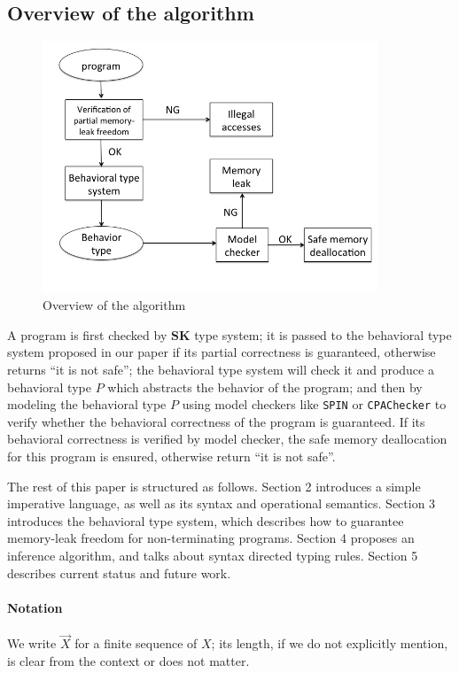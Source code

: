 \documentclass[english]{jssst_ppl} %
\theoremstyle{definition}
\begin{document}
\subsection{Overview of the algorithm}

\begin{figure}
 \centering
\includegraphics[width=10cm]{overview.jpg}
\caption{Overview of the algorithm}
\label{fig:ov}
\end{figure}

A program is first checked by $\mathbf{SK}$ type system; it is passed
to the behavioral type system proposed in our paper if its partial
correctness is guaranteed, otherwise returns ``it is not safe''; the
behavioral type system will check it and produce a behavioral type $P$
which abstracts the behavior of the program; and then by modeling the
behavioral type $P$ using model checkers like \texttt{SPIN} or
\texttt{CPAChecker} to verify whether the behavioral correctness of
the program is guaranteed. If its behavioral correctness is verified
by model checker, the safe memory deallocation for this program is
ensured, otherwise return ``it is not safe''.

The rest of this paper is structured as follows. Section 2 introduces
a simple imperative language, as well as its syntax and operational
semantics. Section 3 introduces the behavioral type system, which
describes how to guarantee memory-leak freedom for non-terminating
programs. Section 4 proposes an inference algorithm, and talks about
syntax directed typing rules. Section 5 describes current status and
future work.

\paragraph{Notation} We write \(\vec{X}\) for a finite sequence of
\(X\); its length, if we do not explicitly mention, is clear from the
context or does not matter.
\end{document}

